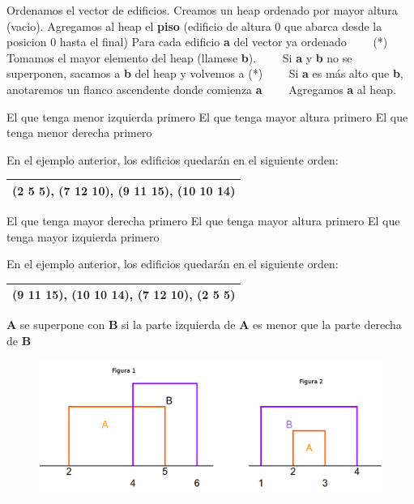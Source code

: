 \begin{codebox}
\li Ordenamos el vector de edificios.
\li Creamos un heap ordenado por mayor altura (vacio).
\li Agregamos al heap el \textbf{piso} (edificio de altura 0 que abarca desde la posicion 0 hasta el final)
\li Para cada edificio \textbf{a} del vector ya ordenado
\li \ \ \ \ (*) Tomamos el mayor elemento del heap (llamese \textbf{b}).
\li \ \ \ \ Si \textbf{a} y \textbf{b} no se superponen, sacamos a \textbf{b} del heap y volvemos a (*)
\li \ \ \ \ Si \textbf{a} es más alto que \textbf{b}, anotaremos un flanco ascendente donde comienza \textbf{a}
\li \ \ \ \ Agregamos \textbf{a} al heap.
\end{codebox}

\begin{codebox}
\li El que tenga menor izquierda primero 
\li El que tenga mayor altura primero
\li El que tenga menor derecha primero
\end{codebox}
En el ejemplo anterior, los edificios quedar\'an en el siguiente orden:
\begin{tabular}{| l |}
\hline
(2 5 5), (7 12 10), (9 11 15), (10 10 14)\\  \hline
\end{tabular}


\begin{codebox}
\li El que tenga mayor derecha primero
\li El que tenga mayor altura primero
\li El que tenga mayor izquierda primero
\end{codebox}
En el ejemplo anterior, los edificios quedar\'an en el siguiente orden:
\begin{tabular}{| l |}
\hline
(9 11 15), (10 10 14), (7 12 10), (2 5 5)   \\  \hline
\end{tabular}

\begin{codebox}
\textbf{A} se superpone con \textbf{B} si la parte izquierda de \textbf{A} es menor que la parte derecha de \textbf{B}
\end{codebox}



\begin{figure}[H]
\centering
\includegraphics[scale=0.36]{./Imagenes/Ej2/ab3.png} 
\end{figure}

